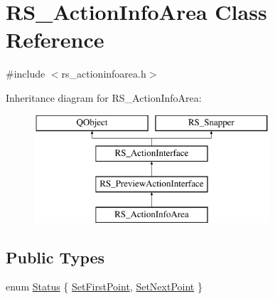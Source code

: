 \hypertarget{classRS__ActionInfoArea}{\section{R\-S\-\_\-\-Action\-Info\-Area Class Reference}
\label{classRS__ActionInfoArea}
}


{\ttfamily \#include $<$rs\-\_\-actioninfoarea.\-h$>$}

Inheritance diagram for R\-S\-\_\-\-Action\-Info\-Area\-:\begin{figure}[H]
\begin{center}
\leavevmode
\includegraphics[height=4.000000cm]{classRS__ActionInfoArea}
\end{center}
\end{figure}
\subsection*{Public Types}
\begin{DoxyCompactItemize}
\item 
enum \hyperlink{classRS__ActionInfoArea_a453c212e4ec9f4e54589b4de4fe341a2}{Status} \{ \hyperlink{classRS__ActionInfoArea_a453c212e4ec9f4e54589b4de4fe341a2a6836447f213e6b302408432a9d6512b7}{Set\-First\-Point}, 
\hyperlink{classRS__ActionInfoArea_a453c212e4ec9f4e54589b4de4fe341a2ac94f2bf4fbe7a9c88db98264233062a0}{Set\-Next\-Point}
 \}
\end{DoxyCompactItemize}
